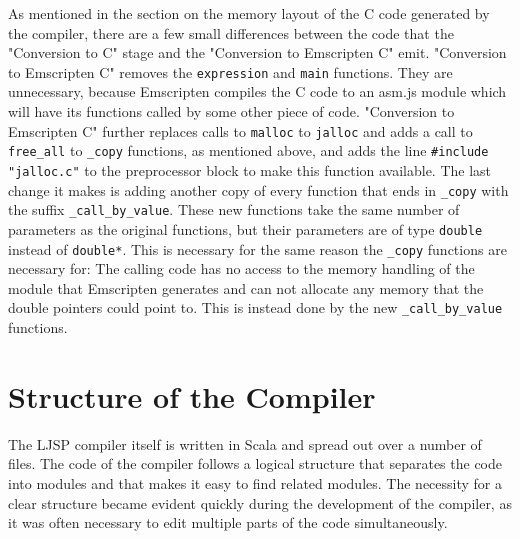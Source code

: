 \documentclass[11pt]{report}
\begin{document}
As mentioned in the section on the memory layout of the C code generated by the compiler, there are a few small differences between the code that the "Conversion to C" stage and the "Conversion to Emscripten C" emit. "Conversion to Emscripten C" removes the \texttt{expression} and \texttt{main} functions. They are unnecessary, because Emscripten compiles the C code to an asm.js module which will have its functions called by some other piece of code. "Conversion to Emscripten C" further replaces calls to \texttt{malloc} to \texttt{jalloc} and adds a call to \texttt{free_all} to \texttt{_copy} functions, as mentioned above, and adds the line \texttt{\#include "jalloc.c"} to the preprocessor block to make this function available. The last change it makes is adding another copy of every function that ends in \texttt{_copy} with the suffix \texttt{_call_by_value}. These new functions take the same number of parameters as the original functions, but their parameters are of type \texttt{double} instead of \texttt{double*}. This is necessary for the same reason the \texttt{_copy} functions are necessary for: The calling code has no access to the memory handling of the module that Emscripten generates and can not allocate any memory that the double pointers could point to. This is instead done by the new \texttt{_call_by_value} functions.

\section{Structure of the Compiler}
The LJSP compiler itself is written in Scala and spread out over a number of files. The code of the compiler follows a logical structure that separates the code into modules and that makes it easy to find related modules. The necessity for a clear structure became evident quickly during the development of the compiler, as it was often necessary to edit multiple parts of the code simultaneously.
\end{document}
